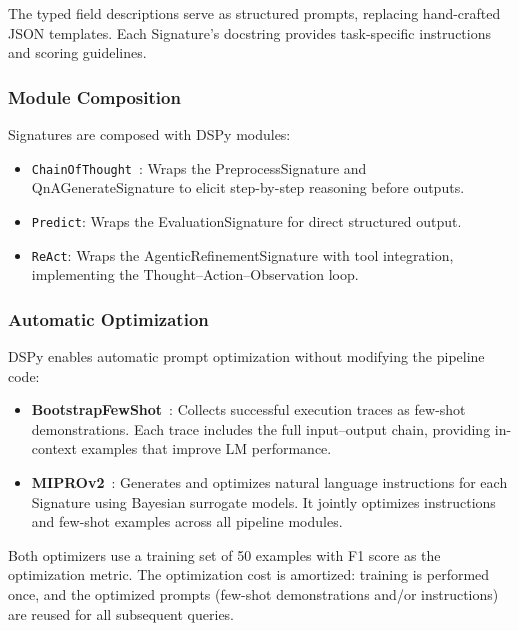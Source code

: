The typed field descriptions serve as structured prompts, replacing hand-crafted JSON templates.
Each Signature's docstring provides task-specific instructions and scoring guidelines.

\subsubsection{Module Composition}
\label{subsubsec:modules}

Signatures are composed with DSPy modules:
\begin{itemize}
    \item \texttt{ChainOfThought}~\cite{wei2022chain}: Wraps the PreprocessSignature and QnAGenerateSignature to elicit step-by-step reasoning before outputs.
    \item \texttt{Predict}: Wraps the EvaluationSignature for direct structured output.
    \item \texttt{ReAct}: Wraps the AgenticRefinementSignature with tool integration, implementing the Thought--Action--Observation loop.
\end{itemize}

\subsubsection{Automatic Optimization}
\label{subsubsec:optimization}

DSPy enables automatic prompt optimization without modifying the pipeline code:

\begin{itemize}
    \item \textbf{BootstrapFewShot}~\cite{khattab2024dspy}: Collects successful execution traces as few-shot demonstrations. Each trace includes the full input--output chain, providing in-context examples that improve LM performance.

    \item \textbf{MIPROv2}~\cite{opsahl2024miprov2}: Generates and optimizes natural language instructions for each Signature using Bayesian surrogate models. It jointly optimizes instructions and few-shot examples across all pipeline modules.
\end{itemize}

Both optimizers use a training set of 50 examples with F1 score as the optimization metric.
The optimization cost is amortized: training is performed once, and the optimized prompts (few-shot demonstrations and/or instructions) are reused for all subsequent queries.

